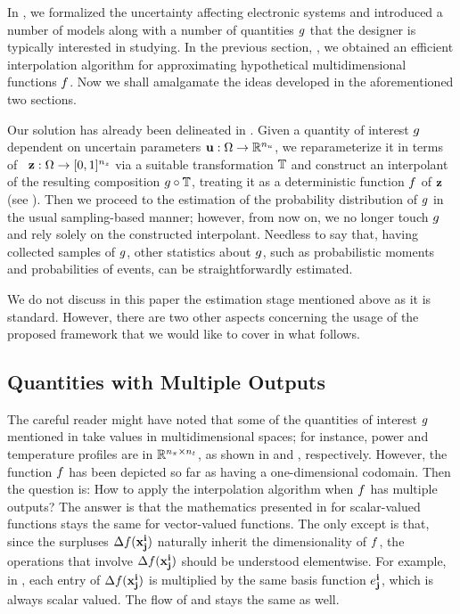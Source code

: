 In , we formalized the uncertainty affecting electronic systems
and introduced a number of models along with a number of quantities $g$ that
the designer is typically interested in studying. In the previous section,
, we obtained an efficient interpolation algorithm for
approximating hypothetical multidimensional functions $f$. Now we shall
amalgamate the ideas developed in the aforementioned two sections.

Our solution has already been delineated in . Given a quantity of
interest $g$ dependent on uncertain parameters $\mathbf{u}: \Omega \to \mathbb{R}^{n_u}$,
we reparameterize it in terms of \rvs\ $\mathbf{z}: \Omega \to [0, 1]^{n_z}$ via a
suitable transformation $\mathbb{T}$ and construct an interpolant of the
resulting composition $g \circ \mathbb{T}$, treating it as a deterministic
function $f$ of $\mathbf{z}$ (see ). Then we proceed to the
estimation of the probability distribution of $g$ in the usual sampling-based
manner; however, from now on, we no longer touch $g$ and rely solely on the
constructed interpolant. Needless to say that, having collected samples of $g$,
other statistics about $g$, such as probabilistic moments and probabilities of
events, can be straightforwardly estimated.

We do not discuss in this paper the estimation stage mentioned above as it is
standard. However, there are two other aspects concerning the usage of the
proposed framework that we would like to cover in what follows.

\subsection{Quantities with Multiple Outputs}
The careful reader might have noted that some of the quantities of interest $g$
mentioned in  take values in multidimensional spaces; for
instance, power and temperature profiles are in $\mathbb{R}^{{n_\pi} \times {n_t}}$, as
shown in  and , respectively.
However, the function $f$ has been depicted so far as having a one-dimensional
codomain. Then the question is: How to apply the interpolation algorithm when
$f$ has multiple outputs? The answer is that the mathematics presented in
 for scalar-valued functions stays the same for
vector-valued functions. The only except is that, since the surpluses
$\Delta f(\mathbf{x}^{\mathbf{i}}_{\mathbf{j}})$ naturally inherit the dimensionality of $f$, the
operations that involve $\Delta f(\mathbf{x}^{\mathbf{i}}_{\mathbf{j}})$ should be understood
elementwise. For example, in , each entry of
$\Delta f(\mathbf{x}^{\mathbf{i}}_{\mathbf{j}})$ is multiplied by the same basis function $e^{\mathbf{i}}_{\mathbf{j}}$,
which is always scalar valued. The flow of  and 
stays the same as well.

